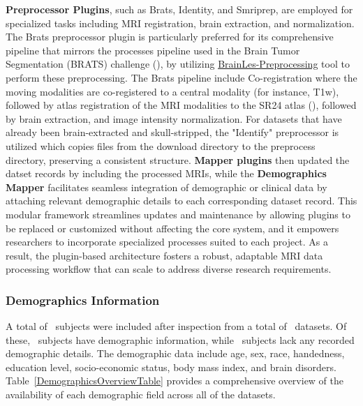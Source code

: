 \textbf{Preprocessor Plugins}, such as Brats, Identity, and Smriprep, are employed for specialized tasks including MRI registration, brain extraction, and normalization. 
The Brats preprocessor plugin is particularly preferred for its comprehensive pipeline that mirrors the processes pipeline used in the Brain Tumor Segmentation (BRATS) 
challenge (\cite{menze2014multimodal}), by utilizing \href{https://github.com/BrainLesion/preprocessing}{BrainLes-Preprocessing} tool to perform these preprocessing. 
The Brats pipeline include Co-registration where the moving modalities are co-registered to a central modality (for instance, T1w), followed by atlas registration of the MRI modalities
to the SR24 atlas (\cite{rohlfing2010sri24}), followed by brain extraction, and image intensity normalization. For datasets that have already been brain-extracted and skull-stripped, 
the "Identify" preprocessor is utilized which copies files from the download directory to the preprocess directory, preserving a consistent structure. 
\textbf{Mapper plugins} then updated the datset records by including the processed MRIs, while the \textbf{Demographics Mapper} facilitates seamless integration of demographic 
or clinical data by attaching relevant demographic details to each corresponding dataset record. This modular framework streamlines updates and maintenance 
by allowing plugins to be replaced or customized without affecting the core system, and it empowers researchers to incorporate specialized processes suited to each project. 
As a result, the plugin-based architecture fosters a robust, adaptable MRI data processing workflow that can scale to address diverse research requirements.


\subsubsection{Demographics Information}



A total of \TotalSubjectsIncludedAfterInspectionCount\ subjects were included after inspection 
from a total of \NumDatasets\ datasets. Of these, \TotalSubjectsWithDemographicsInfoCount\ subjects 
have demographic information, while \TotalSubjectsWithoutDemographicsInfoCount\ 
subjects lack any recorded demographic details. The demographic data include age, sex, race, handedness, education level, 
socio-economic status, body mass index, and brain disorders. Table~\ref{DemographicsOverviewTable} provides a comprehensive 
overview of the availability of each demographic field across all of the datasets.



